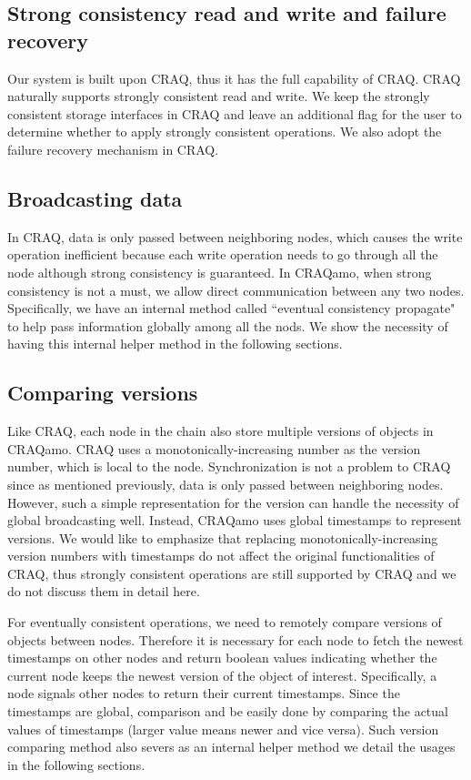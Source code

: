 \subsection{Strong consistency read and write and  failure recovery}
Our system is built upon CRAQ, thus it has the full capability of CRAQ. CRAQ naturally supports strongly consistent read and write. We keep the strongly consistent storage interfaces in CRAQ and leave an additional flag for the user to determine whether to apply strongly consistent operations. We also adopt the failure recovery mechanism in CRAQ.

\subsection{Broadcasting data}
In CRAQ, data is only passed between neighboring nodes, which causes the write operation inefficient because each write operation needs to go through all the node although strong consistency is guaranteed. In CRAQamo, when strong consistency is not a must, we allow direct communication between any two nodes. Specifically, we have an internal method called ``eventual consistency propagate" to help pass information globally among all the nods. We show the necessity of having this internal helper method in the following sections.

\subsection{Comparing versions}
Like CRAQ, each node in the chain also store multiple versions of objects in CRAQamo. CRAQ uses a monotonically-increasing number as the version number, which is local to the node. Synchronization is not a problem to CRAQ since as mentioned previously, data is only passed between neighboring nodes. However, such a simple representation for the version can handle the necessity of global broadcasting well. Instead, CRAQamo uses global timestamps to represent versions. We would like to emphasize that replacing monotonically-increasing version numbers with timestamps do not affect the original functionalities of CRAQ, thus strongly consistent operations are still supported by CRAQ and we do not discuss them in detail here.

For eventually consistent operations, we need to remotely compare versions of objects between nodes. Therefore it is necessary for each node to fetch the newest timestamps on other nodes and return boolean values indicating whether the current node keeps the newest version of the object of interest. Specifically, a node signals other nodes to return their current timestamps. Since the timestamps are global, comparison and be easily done by comparing the actual values of timestamps (larger value means newer and vice versa). Such version comparing method also severs as an internal helper method we detail the usages in the following sections. 

